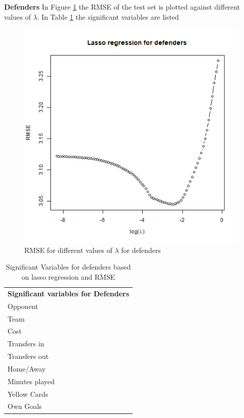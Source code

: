 \textbf{Defenders}
In Figure \ref{fig:lasso_DEF} the RMSE of the test set is plotted against different values of $\lambda$. In Table \ref{tab:sig_var_DEF} the significant variables are listed

\begin{figure}[H]
    \centering
    \includegraphics[scale=0.55]{fig/chapter_6/lasso_DEF.png}
    \caption{RMSE for different values of $\lambda$ for defenders}
\label{fig:lasso_DEF}    
\end{figure}

\begin{table}[H]
\centering
\caption{Significant Variables for defenders based on lasso regression and RMSE}
\label{tab:sig_var_DEF}
\begin{tabular}{l}
\textbf{Significant variables for Defenders }\\
Opponent                              \\
Team                                  \\
Cost                                  \\
Transfers in                          \\
Transfers out                         \\
Home/Away                             \\
Minutes played                        \\
Yellow Cards                          \\
Own Goals                                               
\end{tabular}
\end{table}

